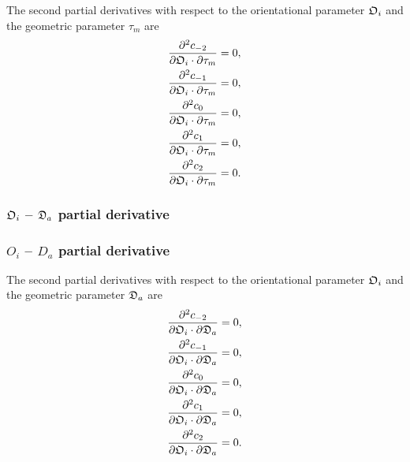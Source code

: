 The second partial derivatives with respect to the orientational parameter $\mathfrak{O}_i$ and the geometric parameter $\tau_m$ are
\begin{subequations}
\begin{align}
    \frac{\partial^2 c_{-2}}{\partial \mathfrak{O}_i \cdot \partial \tau_m}  &=  0, \\
    \frac{\partial^2 c_{-1}}{\partial \mathfrak{O}_i \cdot \partial \tau_m} &= 0, \\
    \frac{\partial^2 c_{0}}{\partial \mathfrak{O}_i \cdot \partial \tau_m}  &= 0, \\
    \frac{\partial^2 c_{1}}{\partial \mathfrak{O}_i \cdot \partial \tau_m}  &= 0, \\
    \frac{\partial^2 c_{2}}{\partial \mathfrak{O}_i \cdot \partial \tau_m}  &= 0.
\end{align}
\end{subequations}



\begin{latexonly}
    \subsubsection{$\mathfrak{O}_i$ -- $\mathfrak{D}_a$ partial derivative}
\end{latexonly}
\begin{htmlonly}
    \subsubsection{$O_i$ -- $D_a$ partial derivative}
\end{htmlonly}

The second partial derivatives with respect to the orientational parameter $\mathfrak{O}_i$ and the geometric parameter $\mathfrak{D}_a$ are
\begin{subequations}
\begin{align}
    \frac{\partial^2 c_{-2}}{\partial \mathfrak{O}_i \cdot \partial \mathfrak{D}_a}  &=  0, \\
    \frac{\partial^2 c_{-1}}{\partial \mathfrak{O}_i \cdot \partial \mathfrak{D}_a} &= 0, \\
    \frac{\partial^2 c_{0}}{\partial \mathfrak{O}_i \cdot \partial \mathfrak{D}_a}  &= 0, \\
    \frac{\partial^2 c_{1}}{\partial \mathfrak{O}_i \cdot \partial \mathfrak{D}_a}  &= 0, \\
    \frac{\partial^2 c_{2}}{\partial \mathfrak{O}_i \cdot \partial \mathfrak{D}_a}  &= 0.
\end{align}
\end{subequations}



